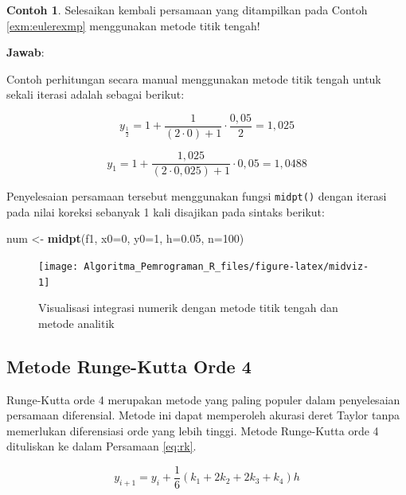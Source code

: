 \documentclass[
]{book}
\newenvironment{Shaded}{\begin{snugshade}}{\end{snugshade}}
\newcommand{\AttributeTok}[1]{\textcolor[rgb]{0.13,0.29,0.53}{#1}}
\newcommand{\DecValTok}[1]{\textcolor[rgb]{0.00,0.00,0.81}{#1}}
\newcommand{\FloatTok}[1]{\textcolor[rgb]{0.00,0.00,0.81}{#1}}
\newcommand{\FunctionTok}[1]{\textcolor[rgb]{0.13,0.29,0.53}{\textbf{#1}}}
\newcommand{\NormalTok}[1]{#1}
\newcommand{\OtherTok}[1]{\textcolor[rgb]{0.56,0.35,0.01}{#1}}
\theoremstyle{definition}
\theoremstyle{definition}
\newtheorem{example}{Contoh}[chapter]
\theoremstyle{definition}
\theoremstyle{definition}
\theoremstyle{remark}
\begin{document}
\begin{example}
\protect\hypertarget{exm:midexmp}{}\label{exm:midexmp}Selesaikan kembali persamaan yang ditampilkan pada Contoh \ref{exm:eulerexmp} menggunakan metode titik tengah!
\end{example}

\textbf{Jawab}:

Contoh perhitungan secara manual menggunakan metode titik tengah untuk sekali iterasi adalah sebagai berikut:

\[
y_{\frac{1}{2}}=1+\frac{1}{\left(2\cdot 0\right)+1}\cdot\frac{0,05}{2}=1,025
\]

\[
y_{1}=1+\frac{1,025}{\left(2\cdot 0,025\right)+1}\cdot0,05=1,0488
\]

Penyelesaian persamaan tersebut menggunakan fungsi \texttt{midpt()} dengan iterasi pada nilai koreksi sebanyak 1 kali disajikan pada sintaks berikut:

\begin{Shaded}
\begin{Highlighting}[]
\NormalTok{num }\OtherTok{\textless{}{-}} \FunctionTok{midpt}\NormalTok{(f1, }\AttributeTok{x0=}\DecValTok{0}\NormalTok{, }\AttributeTok{y0=}\DecValTok{1}\NormalTok{, }\AttributeTok{h=}\FloatTok{0.05}\NormalTok{, }\AttributeTok{n=}\DecValTok{100}\NormalTok{)}
\end{Highlighting}
\end{Shaded}

\begin{figure}

{\centering \texttt{[image: Algoritma\_Pemrograman\_R\_files/figure-latex/midviz-1]} 

}

\caption{Visualisasi integrasi numerik dengan metode titik tengah dan metode analitik}\label{fig:midviz}
\end{figure}

\hypertarget{rungekutta}{%
\subsection{Metode Runge-Kutta Orde 4}\label{rungekutta}}

Runge-Kutta orde 4 merupakan metode yang paling populer dalam penyelesaian persamaan diferensial. Metode ini dapat memperoleh akurasi deret Taylor tanpa memerlukan diferensiasi orde yang lebih tinggi. Metode Runge-Kutta orde 4 dituliskan ke dalam Persamaan \eqref{eq:rk}.

\begin{equation}
y_{i+1}=y_i+\frac{1}{6}\left(k_1+2k_2+2k_3+k_4\right)h
  \label{eq:rk}
\end{equation}
\end{document}
